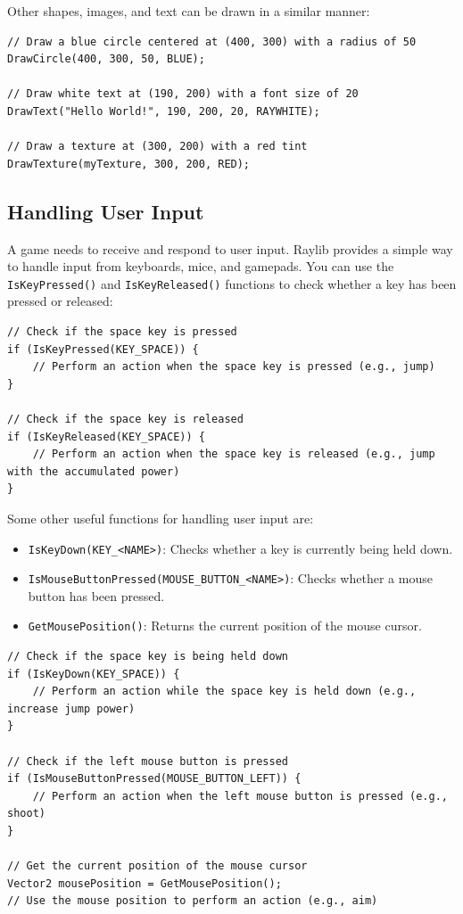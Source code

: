 Other shapes, images, and text can be drawn in a similar manner:
\begin{verbatim}
// Draw a blue circle centered at (400, 300) with a radius of 50
DrawCircle(400, 300, 50, BLUE);

// Draw white text at (190, 200) with a font size of 20
DrawText("Hello World!", 190, 200, 20, RAYWHITE);

// Draw a texture at (300, 200) with a red tint
DrawTexture(myTexture, 300, 200, RED);
\end{verbatim}

\subsection{Handling User Input}

A game needs to receive and respond to user input. Raylib provides a simple way to handle input from keyboards, mice, and gamepads. You can use the \texttt{IsKeyPressed()} and \texttt{IsKeyReleased()} functions to check whether a key has been pressed or released:
\begin{verbatim}
// Check if the space key is pressed
if (IsKeyPressed(KEY_SPACE)) {
    // Perform an action when the space key is pressed (e.g., jump)
}

// Check if the space key is released
if (IsKeyReleased(KEY_SPACE)) {
    // Perform an action when the space key is released (e.g., jump with the accumulated power)
}
\end{verbatim}

Some other useful functions for handling user input are:
\begin{itemize}
    \item \texttt{IsKeyDown(KEY\_<NAME>)}: Checks whether a key is currently being held down.
    \item \texttt{IsMouseButtonPressed(MOUSE\_BUTTON\_<NAME>)}: Checks whether a mouse button has been pressed.
    \item \texttt{GetMousePosition()}: Returns the current position of the mouse cursor.
\end{itemize}
\begin{verbatim}
// Check if the space key is being held down
if (IsKeyDown(KEY_SPACE)) {
    // Perform an action while the space key is held down (e.g., increase jump power)
}

// Check if the left mouse button is pressed
if (IsMouseButtonPressed(MOUSE_BUTTON_LEFT)) {
    // Perform an action when the left mouse button is pressed (e.g., shoot)
}

// Get the current position of the mouse cursor
Vector2 mousePosition = GetMousePosition();
// Use the mouse position to perform an action (e.g., aim)
\end{verbatim}

